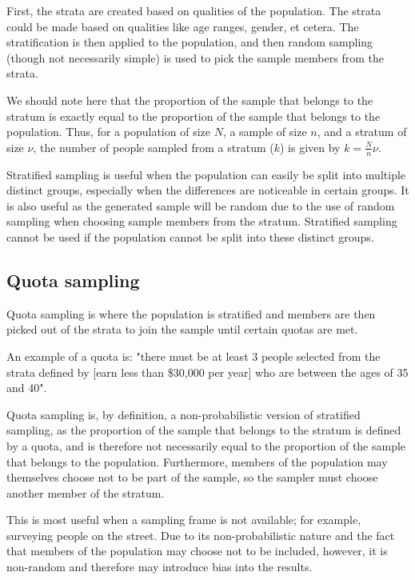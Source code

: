 First, the strata are created based on qualities of the population. The strata could be made based on qualities like age ranges, gender, et cetera. The stratification is then applied to the population, and then random sampling (though not necessarily simple) is used to pick the sample members from the strata.

We should note here that the proportion of the sample that belongs to the stratum is exactly equal to the proportion of the sample that belongs to the population. Thus, for a population of size $N$, a sample of size $n$, and a stratum of size $\nu$, the number of people sampled from a stratum ($k$) is given by $k = \frac{N}{n}\nu$.

Stratified sampling is useful when the population can easily be split into multiple distinct groups, especially when the differences are noticeable in certain groups. It is also useful as the generated sample will be random due to the use of random sampling when choosing sample members from the stratum. Stratified sampling cannot be used if the population cannot be split into these distinct groups.

\subsection{Quota sampling}

\begin{tcolorbox}
    \begin{definition}
        Quota sampling is where the population is stratified and members are then picked out of the strata to join the sample until certain quotas are met.
    \end{definition}
\end{tcolorbox}

An example of a quota is: "there must be at least 3 people selected from the strata defined by [earn less than \$30,000 per year] who are between the ages of 35 and 40".

Quota sampling is, by definition, a non-probabilistic version of stratified sampling, as the proportion of the sample that belongs to the stratum is defined by a quota, and is therefore not necessarily equal to the proportion of the sample that belongs to the population. Furthermore, members of the population may themselves choose not to be part of the sample, so the sampler must choose another member of the stratum.

This is most useful when a sampling frame is not available; for example, surveying people on the street. Due to its non-probabilistic nature and the fact that members of the population may choose not to be included, however, it is non-random and therefore may introduce bias into the results.

